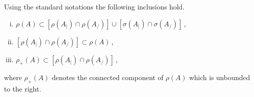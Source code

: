 \begin{proposition}\label{prop:a3-4.2}

Using the standard notations the following inclusions hold.
\begin{enumerate}[(i)]
\item 
$\rho(A) \subset [\rho(A_{|}) \cap \rho(A_{/})] \cup [\sigma(A_{|}) \cap \sigma(A_{/})]$\,,

\item 
$[\rho(A_{|}) \cap \rho(A_{/})] \subset \rho(A) $\,,

\item 
$\rho_{+}(A) \subset [\rho(A_{|}) \cap \rho(A_{/})]$\,,
\end{enumerate}
 where $\rho_{+}(A)$ denotes the connected component of $\rho(A)$ which is unbounded to the right.

\end{proposition}

